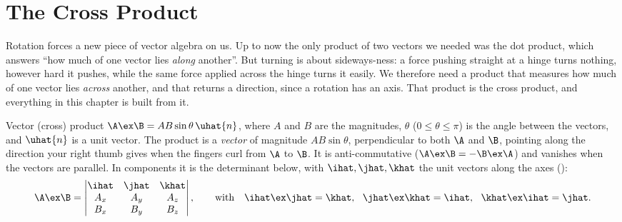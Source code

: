\section{The Cross Product}
Rotation forces a new piece of vector algebra on us. Up to now the only product of two vectors we needed was the dot
product, which answers ``how much of one vector lies \emph{along} another''. But turning is about
sideways-ness: a force pushing straight at a hinge turns nothing, however hard it pushes, while the same
force applied across the hinge turns it easily. We therefore need a product that measures how much of
one vector lies \emph{across} another, and that returns a direction, since a rotation has an axis. That
product is the cross product, and everything in this chapter is built from it.

\begin{defbox}{Vector (cross) product}
$\A\ex\B=AB\sin\theta\,\uhat{n}$, where $A$ and $B$ are the magnitudes, $\theta$ ($0\le\theta\le\pi$) is
the angle between the vectors, and $\uhat{n}$ is a unit vector. The product is a \emph{vector} of magnitude $AB\sin\theta$, perpendicular to both $\A$
and $\B$, pointing along the direction your right thumb gives when the fingers curl from $\A$ to $\B$. It
is anti-commutative ($\A\ex\B=-\B\ex\A$) and vanishes when the vectors are parallel. In components it is
the determinant below, with $\ihat,\jhat,\khat$ the unit vectors along the axes ():
\[
\A\ex\B=\begin{vmatrix}\ihat & \jhat & \khat\\ A_x & A_y & A_z\\ B_x & B_y & B_z\end{vmatrix},
\qquad\text{with}\quad \ihat\ex\jhat=\khat,\ \ \jhat\ex\khat=\ihat,\ \ \khat\ex\ihat=\jhat.
\]
\end{defbox}

\begin{figure}[htbp]
\centering
{}
\end{figure}

